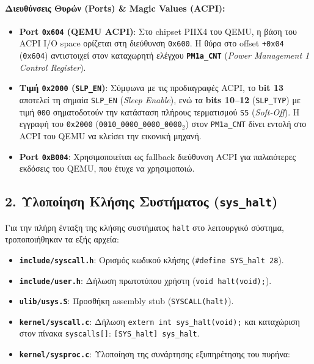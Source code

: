 \documentclass[11pt,a4paper]{article}
\begin{document}
\paragraph{Διευθύνσεις Θυρών (Ports) \& Magic Values (ACPI):}
\begin{itemize}
    \item \textbf{Port \texttt{0x604} (QEMU ACPI)}: Στο chipset PIIX4 του QEMU, η βάση του ACPI I/O space ορίζεται στη διεύθυνση \texttt{0x600}. 
    Η θύρα στο offset \texttt{+0x04} (\texttt{0x604}) αντιστοιχεί στον καταχωρητή ελέγχου \textbf{\texttt{PM1a\_CNT}} (\textit{Power Management 1 Control Register}).
    \item \textbf{Τιμή \texttt{0x2000} (\texttt{SLP\_EN})}: Σύμφωνα με τις προδιαγραφές ACPI, το \textbf{bit 13} αποτελεί τη σημαία \texttt{SLP\_EN} (\textit{Sleep Enable}), 
    ενώ τα \textbf{bits 10--12} (\texttt{SLP\_TYP}) με τιμή \texttt{000} σηματοδοτούν την κατάσταση πλήρους τερματισμού \texttt{S5} (\textit{Soft-Off}). 
    Η εγγραφή του \texttt{0x2000} (\texttt{0010\_0000\_0000\_0000}$_2$) στον \texttt{PM1a\_CNT} δίνει εντολή στο ACPI του QEMU να κλείσει την εικονική μηχανή.
    \item \textbf{Port \texttt{0xB004}}: Χρησιμοποιείται ως fallback διεύθυνση ACPI για παλαιότερες εκδόσεις του QEMU, που έτυχε να χρησιμοποιώ.
\end{itemize}

\clearpage
\subsection*{2. Υλοποίηση Κλήσης Συστήματος (\texttt{sys\_halt})}
Για την πλήρη ένταξη της κλήσης συστήματος \texttt{halt} στο λειτουργικό σύστημα, τροποποιήθηκαν τα εξής αρχεία:
\begin{itemize}
    \item \textbf{\texttt{include/syscall.h}}: Ορισμός κωδικού κλήσης (\texttt{\#define SYS\_halt 28}).
    \item \textbf{\texttt{include/user.h}}: Δήλωση πρωτοτύπου χρήστη (\texttt{void halt(void);}).
    \item \textbf{\texttt{ulib/usys.S}}: Προσθήκη assembly stub (\texttt{SYSCALL(halt)}).
    \item \textbf{\texttt{kernel/syscall.c}}: Δήλωση \texttt{extern int sys\_halt(void);} και καταχώριση στον πίνακα \texttt{syscalls[]}: \texttt{[SYS\_halt] sys\_halt}.
    \item \textbf{\texttt{kernel/sysproc.c}}: Υλοποίηση της συνάρτησης εξυπηρέτησης του πυρήνα:
\end{itemize}
\end{document}
